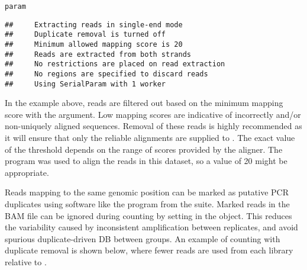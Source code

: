 \documentclass{report}\usepackage[]{graphicx}\usepackage[usenames,dvipsnames]{color}
\newcommand{\hlnum}[1]{\textcolor[rgb]{0.816,0.125,0.439}{#1}}%
\newcommand{\hlopt}[1]{\textcolor[rgb]{0,0,0}{#1}}%
\newcommand{\hlstd}[1]{\textcolor[rgb]{0.251,0.251,0.251}{#1}}%
\newcommand{\hlkwb}[1]{\textcolor[rgb]{0,0,0}{#1}}%
\newcommand{\hlkwc}[1]{\textcolor[rgb]{0.251,0.251,0.251}{#1}}%
\newcommand{\hlkwd}[1]{\textcolor[rgb]{0.878,0.439,0.125}{#1}}%
\newenvironment{knitrout}{}{} %
\begin{document}
\begin{knitrout}
\color{fgcolor}\begin{kframe}
\begin{alltt}
\hlstd{param}
\end{alltt}
\begin{verbatim}
##     Extracting reads in single-end mode
##     Duplicate removal is turned off 
##     Minimum allowed mapping score is 20 
##     Reads are extracted from both strands
##     No restrictions are placed on read extraction
##     No regions are specified to discard reads
##     Using SerialParam with 1 worker
\end{verbatim}
\end{kframe}
\end{knitrout}

In the example above, reads are filtered out based on the minimum mapping score with the  argument. 
Low mapping scores are indicative of incorrectly and/or non-uniquely aligned sequences. 
Removal of these reads is highly recommended as it will ensure that only the reliable alignments are supplied to .
The exact value of the threshold depends on the range of scores provided by the aligner. 
The  program \cite{liao2013} was used to align the reads in this dataset, so a value of 20 might be appropriate.

Reads mapping to the same genomic position can be marked as putative PCR duplicates using software like the  program from the  suite.
Marked reads in the BAM file can be ignored during counting by setting  in the  object. 
This reduces the variability caused by inconsistent amplification between replicates, and avoid spurious duplicate-driven DB between groups. 
An example of counting with duplicate removal is shown below, where fewer reads are used from each library relative to .

\begin{knitrout}
\color{fgcolor}
\end{knitrout}
\end{document}
